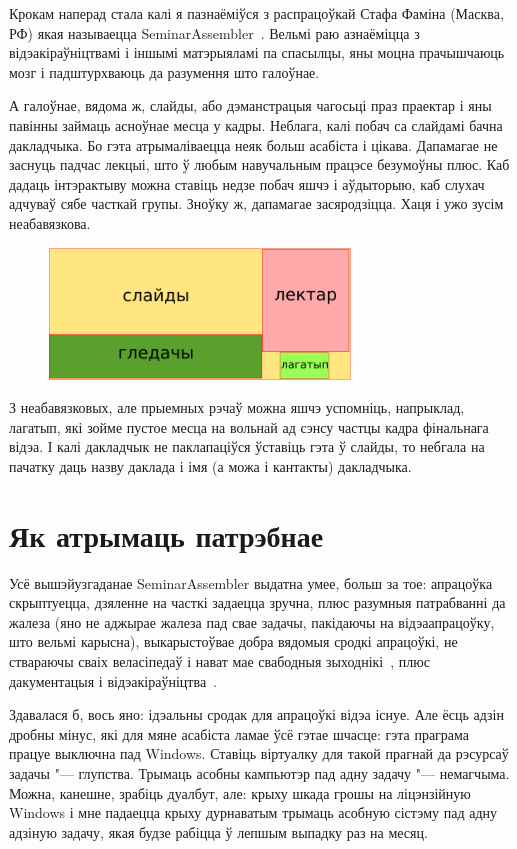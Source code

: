 \documentclass[10pt, a5paper]{article}
\begin{document}
Крокам наперад стала калі я пазнаёміўся з распрацоўкай Стафа Фаміна (Масква, РФ) якая называецца SeminarAssembler~\cite{Zakharevich3}. Вельмі раю азнаёміцца з відэакіраўніцтвамі і іншымі матэрыяламі па спасылцы, яны моцна прачышчаюць мозг і падштурхваюць да разумення што галоўнае.

А галоўнае, вядома ж, слайды, або дэманстрацыя чагосьці праз праектар і яны павінны займаць асноўнае месца у кадры. Неблага, калі побач са слайдамі бачна дакладчыка. Бо гэта атрымаліваецца неяк больш асабіста і цікава. Дапамагае не заснуць падчас лекцыі, што ў любым навучальным працэсе безумоўны плюс. Каб дадаць інтэрактыву можна ставіць недзе побач яшчэ і аўдыторыю, каб слухач адчуваў сябе часткай групы. Зноўку ж, дапамагае засяродзіцца. Хаця і ужо зусім неабавязкова.

\begin{figure}[h!]
  \centering
  \includegraphics[width=8cm]{32_2016_Zakharevich3.png}
\end{figure}

З неабавязковых, але прыемных рэчаў можна яшчэ успомніць, напрыклад, лагатып, які зойме пустое месца на вольнай ад сэнсу частцы кадра фінальнага відэа. І калі дакладчык не паклапаціўся ўставіць гэта ў слайды, то небгала на пачатку даць назву даклада і імя (а можа і кантакты) дакладчыка.

\section*{Як атрымаць патрэбнае}

Усё вышэйузгаданае SeminarAssembler выдатна умее, больш за тое: апрацоўка скрыптуецца, дзяленне на часткі задаецца зручна, плюс разумныя патрабванні да жалеза (яно не аджырае жалеза пад свае задачы, пакідаючы на відэаапрацоўку, што вельмі карысна), выкарыстоўвае добра вядомыя сродкі апрацоўкі, не ствараючы сваіх веласіпедаў і нават мае свабодныя зыходнікі~\cite{Zakharevich4}, плюс дакументацыя і відэакіраўніцтва~\cite{Zakharevich3}.

Здавалася б, вось яно: ідэальны сродак для апрацоўкі відэа існуе. Але ёсць адзін дробны мінус, які для мяне асабіста ламае ўсё гэтае шчасце: гэта праграма працуе выключна пад Windows. Ставіць віртуалку для такой прагнай да рэсурсаў задачы "--- глупства. Трымаць асобны кампьютэр пад адну задачу "--- немагчыма. Можна, канешне, зрабіць дуалбут, але: крыху шкада грошы на ліцэнзійную Windows і мне падаецца крыху дурнаватым трымаць асобную сістэму пад адну адзіную задачу, якая будзе рабіцца ў лепшым выпадку раз на месяц.
\end{document}
